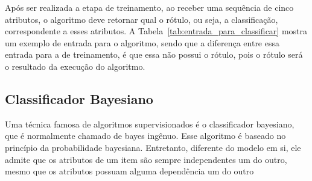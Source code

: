 \begin{table}[h]
\centering
{}
\caption{Entradas de treinamento para o aprendizado de máquina}
\label{tab:entradas_de_treinamento}
\end{table}

Após ser realizada a etapa de treinamento, ao receber uma sequência de cinco
atributos, o algoritmo deve retornar qual o rótulo, ou seja, a classificação,
correspondente a esses atributos. A Tabela~\ref{tab:entrada_para_classificar}
mostra um exemplo de entrada para o algoritmo, sendo que a diferença entre
essa entrada para a de treinamento, é que essa não possui o rótulo, pois o rótulo será o resultado
da execução do algoritmo.

\begin{table}[h]
\centering
{}
\caption{Entrada de dados para o algoritmo determinar o rótulo}
\label{tab:entrada_para_classificar}
\end{table}


\subsection{Classificador Bayesiano} \label{sec:classificador_bayesiano}

Uma técnica famosa de algoritmos supervisionados é o classificador bayesiano,
que é normalmente chamado de bayes ingênuo. Esse algoritmo é baseado no
princípio da probabilidade bayesiana. Entretanto, diferente do modelo em si,
ele admite que os atributos de um item são sempre independentes um do outro,
mesmo que os atributos possuam alguma dependência um do outro \cite{segaran2007programming}

